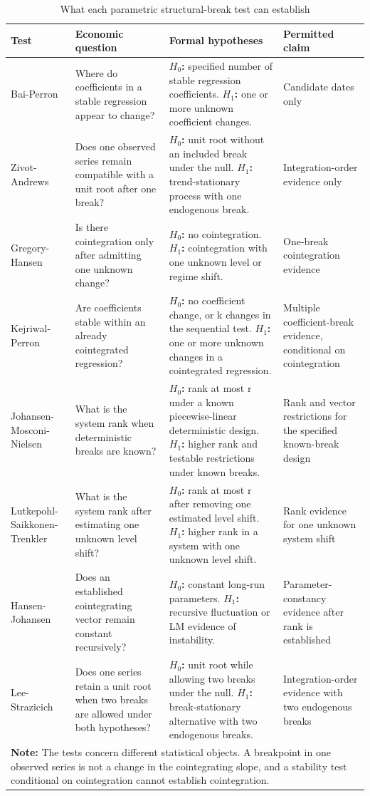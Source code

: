 \begin{table}[h!]
\centering\scriptsize
\caption{What each parametric structural-break test can establish}
\label{tab:test-map}
\begin{tabular}{p{2.25cm}p{3.05cm}p{4.45cm}p{3.05cm}}
\toprule
\textbf{Test} & \textbf{Economic question} & \textbf{Formal hypotheses} & \textbf{Permitted claim}\\
\midrule
Bai-Perron & Where do coefficients in a stable regression appear to change? & \textbf{$H_0$:} specified number of stable regression coefficients. \textbf{$H_1$:} one or more unknown coefficient changes. & Candidate dates only \\
Zivot-Andrews & Does one observed series remain compatible with a unit root after one break? & \textbf{$H_0$:} unit root without an included break under the null. \textbf{$H_1$:} trend-stationary process with one endogenous break. & Integration-order evidence only \\
Gregory-Hansen & Is there cointegration only after admitting one unknown change? & \textbf{$H_0$:} no cointegration. \textbf{$H_1$:} cointegration with one unknown level or regime shift. & One-break cointegration evidence \\
Kejriwal-Perron & Are coefficients stable within an already cointegrated regression? & \textbf{$H_0$:} no coefficient change, or k changes in the sequential test. \textbf{$H_1$:} one or more unknown changes in a cointegrated regression. & Multiple coefficient-break evidence, conditional on cointegration \\
Johansen-Mosconi-Nielsen & What is the system rank when deterministic breaks are known? & \textbf{$H_0$:} rank at most r under a known piecewise-linear deterministic design. \textbf{$H_1$:} higher rank and testable restrictions under known breaks. & Rank and vector restrictions for the specified known-break design \\
Lutkepohl-Saikkonen-Trenkler & What is the system rank after estimating one unknown level shift? & \textbf{$H_0$:} rank at most r after removing one estimated level shift. \textbf{$H_1$:} higher rank in a system with one unknown level shift. & Rank evidence for one unknown system shift \\
Hansen-Johansen & Does an established cointegrating vector remain constant recursively? & \textbf{$H_0$:} constant long-run parameters. \textbf{$H_1$:} recursive fluctuation or LM evidence of instability. & Parameter-constancy evidence after rank is established \\
Lee-Strazicich & Does one series retain a unit root when two breaks are allowed under both hypotheses? & \textbf{$H_0$:} unit root while allowing two breaks under the null. \textbf{$H_1$:} break-stationary alternative with two endogenous breaks. & Integration-order evidence with two endogenous breaks \\
\bottomrule
\multicolumn{4}{p{13.1cm}}{\footnotesize \textbf{Note:} The tests concern different statistical objects. A breakpoint in one observed series is not a change in the cointegrating slope, and a stability test conditional on cointegration cannot establish cointegration.}
\end{tabular}
\end{table}

